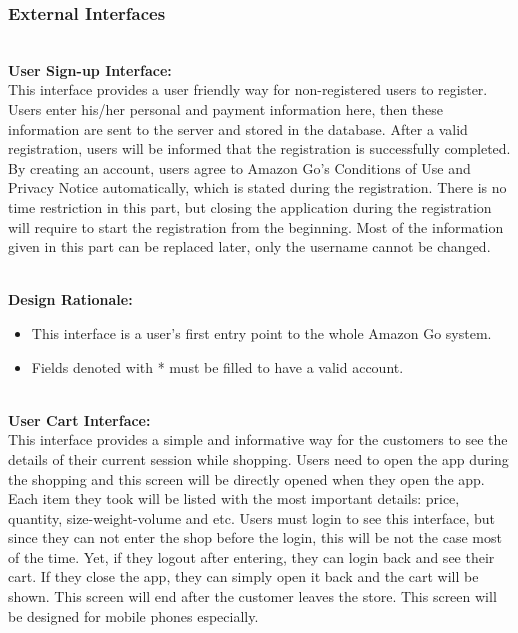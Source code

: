 \documentclass[11pt]{article}
\newcounter{subsubsubsection}[subsubsection]
\begin{document}
    \subsubsection{External Interfaces}
    
    \textbf{\\User Sign-up Interface:\\}
    This interface provides a user friendly way for non-registered users to register. Users enter his/her personal and payment information
    here, then these information are sent to the server and stored in the database.
    After a valid registration, users will be informed that the registration is successfully
    completed. By creating an account, users agree to Amazon Go's Conditions of Use
    and Privacy Notice automatically, which is stated during the registration. There is
    no time restriction in this part, but closing the application during the registration
    will require to start the registration from the beginning. Most of the information
    given in this part can be replaced later, only the username cannot be changed.
    
    \textbf{\\Design Rationale:}
    \begin{itemize}
       \item This interface is a user's first entry point to the whole Amazon Go system. 
       \item Fields denoted with * must be filled to have a valid account.
    \end{itemize}

    \textbf{\\User Cart Interface:\\}
    This interface provides a simple and informative way for
    the customers to see the details of their current session while shopping. Users need
    to open the app during the shopping and this screen will be directly opened when
    they open the app. Each item they took will be listed with the most important
    details: price, quantity, size-weight-volume and etc. Users must login to see this
    interface, but since they can not enter the shop before the login, this will be not the
    case most of the time. Yet, if they logout after entering, they can login back and see
    their cart. If they close the app, they can simply open it back and the cart will be
    shown. This screen will end after the customer leaves the store. This screen will be 
    designed for mobile phones especially.
    
\end{document}
